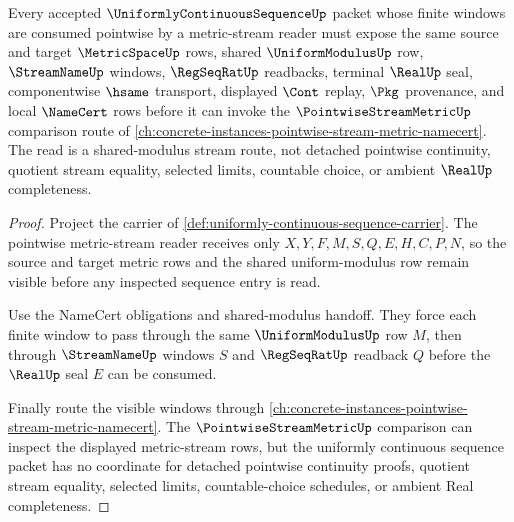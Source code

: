 \begin{theorem}
\label{thm:uniformly-continuous-sequence-pointwise-stream-metric-route}
Every accepted $\UniformlyContinuousSequenceUp$ packet whose finite windows are consumed pointwise by a metric-stream reader must expose the same source and target $\MetricSpaceUp$ rows, shared $\UniformModulusUp$ row, $\StreamNameUp$ windows, $\RegSeqRatUp$ readbacks, terminal $\RealUp$ seal, componentwise $\hsame$ transport, displayed $\Cont$ replay, $\Pkg$ provenance, and local $\NameCert$ rows before it can invoke the $\PointwiseStreamMetricUp$ comparison route of \autoref{ch:concrete-instances-pointwise-stream-metric-namecert}. The read is a shared-modulus stream route, not detached pointwise continuity, quotient stream equality, selected limits, countable choice, or ambient $\RealUp$ completeness.
\end{theorem}
\begin{proof}
Project the carrier of \autoref{def:uniformly-continuous-sequence-carrier}. The pointwise metric-stream reader receives only $X,Y,F,M,S,Q,E,H,C,P,N$, so the source and target metric rows and the shared uniform-modulus row remain visible before any inspected sequence entry is read.

Use the NameCert obligations and shared-modulus handoff. They force each finite window to pass through the same $\UniformModulusUp$ row $M$, then through $\StreamNameUp$ windows $S$ and $\RegSeqRatUp$ readback $Q$ before the $\RealUp$ seal $E$ can be consumed.

Finally route the visible windows through \autoref{ch:concrete-instances-pointwise-stream-metric-namecert}. The $\PointwiseStreamMetricUp$ comparison can inspect the displayed metric-stream rows, but the uniformly continuous sequence packet has no coordinate for detached pointwise continuity proofs, quotient stream equality, selected limits, countable-choice schedules, or ambient Real completeness.
\end{proof}
